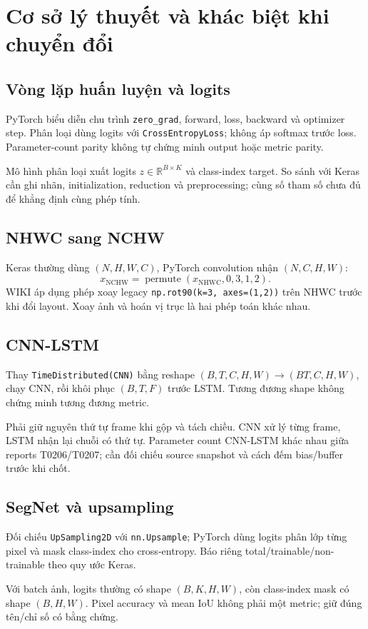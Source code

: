 \chapter{Cơ sở lý thuyết và khác biệt khi chuyển đổi}
\section{Vòng lặp huấn luyện và logits}
PyTorch biểu diễn chu trình \texttt{zero\_grad}, forward, loss, backward và optimizer step. Phân loại dùng logits với \texttt{CrossEntropyLoss}; không áp softmax trước loss. Parameter-count parity không tự chứng minh output hoặc metric parity.

Mô hình phân loại xuất logits $z\in\mathbb{R}^{B\times K}$ và class-index target. So sánh với Keras cần ghi nhãn, initialization, reduction và preprocessing; cùng số tham số chưa đủ để khẳng định cùng phép tính.

\section{NHWC sang NCHW}
Keras thường dùng $(N,H,W,C)$, PyTorch convolution nhận $(N,C,H,W)$:
\[
x_{\mathrm{NCHW}}=\operatorname{permute}(x_{\mathrm{NHWC}},0,3,1,2).
\]
WIKI áp dụng phép xoay legacy \texttt{np.rot90(k=3, axes=(1,2))} trên NHWC trước khi đổi layout. Xoay ảnh và hoán vị trục là hai phép toán khác nhau.

\section{CNN-LSTM}
Thay \texttt{TimeDistributed(CNN)} bằng reshape $(B,T,C,H,W)\to(BT,C,H,W)$, chạy CNN, rồi khôi phục $(B,T,F)$ trước LSTM. Tương đương shape không chứng minh tương đương metric.

Phải giữ nguyên thứ tự frame khi gộp và tách chiều. CNN xử lý từng frame, LSTM nhận lại chuỗi có thứ tự. Parameter count CNN-LSTM khác nhau giữa reports T0206/T0207; cần đối chiếu source snapshot và cách đếm bias/buffer trước khi chốt.

\section{SegNet và upsampling}
Đối chiếu \texttt{UpSampling2D} với \texttt{nn.Upsample}; PyTorch dùng logits phân lớp từng pixel và mask class-index cho cross-entropy. Báo riêng total/trainable/non-trainable theo quy ước Keras.

Với batch ảnh, logits thường có shape $(B,K,H,W)$, còn class-index mask có shape $(B,H,W)$. Pixel accuracy và mean IoU không phải một metric; giữ đúng tên/chỉ số có bằng chứng.

